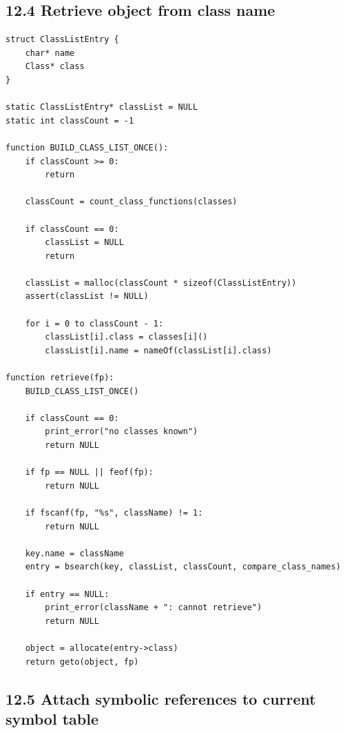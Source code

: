 \documentclass[11pt]{article}
\begin{document}
\subsection{12.4 Retrieve object from class
name}\label{retrieve-object-from-class-name}

\begin{verbatim}
struct ClassListEntry {
    char* name
    Class* class
}

static ClassListEntry* classList = NULL
static int classCount = -1

function BUILD_CLASS_LIST_ONCE():
    if classCount >= 0:
        return

    classCount = count_class_functions(classes)

    if classCount == 0:
        classList = NULL
        return

    classList = malloc(classCount * sizeof(ClassListEntry))
    assert(classList != NULL)

    for i = 0 to classCount - 1:
        classList[i].class = classes[i]()
        classList[i].name = nameOf(classList[i].class)

function retrieve(fp):
    BUILD_CLASS_LIST_ONCE()

    if classCount == 0:
        print_error("no classes known")
        return NULL

    if fp == NULL || feof(fp):
        return NULL

    if fscanf(fp, "%s", className) != 1:
        return NULL

    key.name = className
    entry = bsearch(key, classList, classCount, compare_class_names)

    if entry == NULL:
        print_error(className + ": cannot retrieve")
        return NULL

    object = allocate(entry->class)
    return geto(object, fp)
\end{verbatim}

\subsection{12.5 Attach symbolic references to current symbol
table}\label{attach-symbolic-references-to-current-symbol-table}
\end{document}
